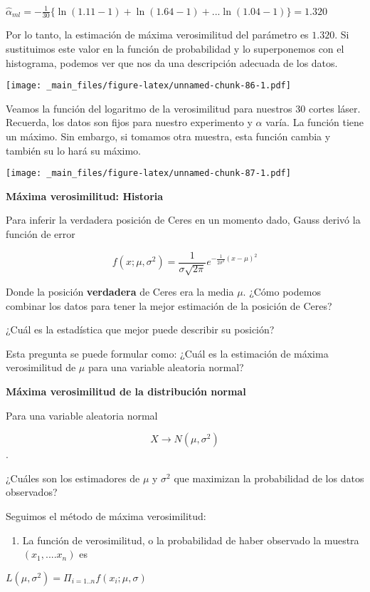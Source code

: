 \documentclass[
]{book}
\providecommand{\tightlist}{%
  \setlength{\itemsep}{0pt}\setlength{\parskip}{0pt}}
\begin{document}
\(\hat{\alpha}_{ml}=-\frac{1}{30}\{ \ln (1.11-1)+ \ln (1.64-1)+...\ln (1.04-1)\}=1.320\)

Por lo tanto, la estimación de máxima verosimilitud del parámetro es \(1.320\). Si sustituimos este valor en la función de probabilidad y lo superponemos con el histograma, podemos ver que nos da una descripción adecuada de los datos.

\texttt{[image: \_main\_files/figure-latex/unnamed-chunk-86-1.pdf]}

Veamos la función del logaritmo de la verosimilitud para nuestros \(30\) cortes láser. Recuerda, los datos son fijos para nuestro experimento y \(\alpha\) varía. La función tiene un máximo. Sin embargo, si tomamos otra muestra, esta función cambia y también su lo hará su máximo.

\texttt{[image: \_main\_files/figure-latex/unnamed-chunk-87-1.pdf]}

\textbf{Máxima verosimilitud: Historia}

Para inferir la verdadera posición de Ceres en un momento dado, Gauss derivó la función de error

\[f(x; \mu, \sigma^2)= \frac{1}{\sigma \sqrt{2 \pi}} e^{-\frac{1}{2\sigma^2} (x- \mu)^2}\]

Donde la posición \textbf{verdadera} de Ceres era la media \(\mu\). ¿Cómo podemos combinar los datos para tener la mejor estimación de la posición de Ceres?

¿Cuál es la estadística que mejor puede describir su posición?

Esta pregunta se puede formular como: ¿Cuál es la estimación de máxima verosimilitud de \(\mu\) para una variable aleatoria normal?

\textbf{Máxima verosimilitud de la distribución normal}

Para una variable aleatoria normal

\[X \rightarrow N(\mu, \sigma^2)\].

¿Cuáles son los estimadores de \(\mu\) y \(\sigma^2\) que maximizan la probabilidad de los datos observados?

Seguimos el método de máxima verosimilitud:

\begin{enumerate}
\def\labelenumi{\arabic{enumi}.}
\tightlist
\item
  La función de verosimilitud, o la probabilidad de haber observado la muestra \((x_1, ....x_n)\) es
\end{enumerate}

\(L(\mu, \sigma^2)=\Pi_{i=1..n} f(x_i;\mu,\sigma)\)
\end{document}
